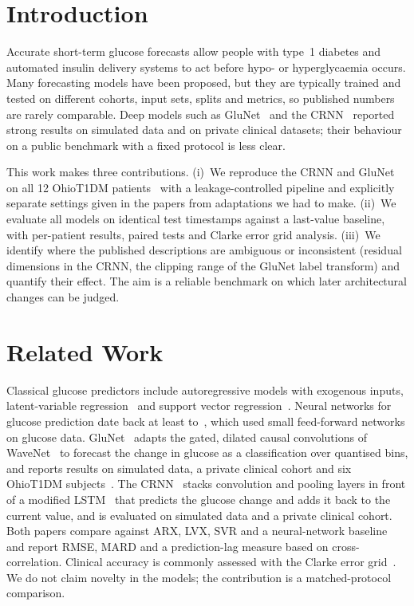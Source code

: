 \documentclass[conference]{IEEEtran}
\begin{document}
\section{Introduction}
Accurate short-term glucose forecasts allow people with type~1 diabetes and automated insulin delivery systems to act before hypo- or hyperglycaemia occurs. Many forecasting models have been proposed, but they are typically trained and tested on different cohorts, input sets, splits and metrics, so published numbers are rarely comparable. Deep models such as GluNet~\cite{glunet} and the CRNN~\cite{crnn} reported strong results on simulated data and on private clinical datasets; their behaviour on a public benchmark with a fixed protocol is less clear.

This work makes three contributions. (i)~We reproduce the CRNN and GluNet on all 12 OhioT1DM patients~\cite{ohio} with a leakage-controlled pipeline and explicitly separate settings given in the papers from adaptations we had to make. (ii)~We evaluate all models on identical test timestamps against a last-value baseline, with per-patient results, paired tests and Clarke error grid analysis. (iii)~We identify where the published descriptions are ambiguous or inconsistent (residual dimensions in the CRNN, the clipping range of the GluNet label transform) and quantify their effect. The aim is a reliable benchmark on which later architectural changes can be judged.
\section{Related Work}
Classical glucose predictors include autoregressive models with exogenous inputs, latent-variable regression~\cite{lvx} and support vector regression~\cite{svr}. Neural networks for glucose prediction date back at least to~\cite{nnpg}, which used small feed-forward networks on glucose data. GluNet~\cite{glunet} adapts the gated, dilated causal convolutions of WaveNet~\cite{wavenet} to forecast the change in glucose as a classification over quantised bins, and reports results on simulated data, a private clinical cohort and six OhioT1DM subjects~\cite{ohio}. The CRNN~\cite{crnn} stacks convolution and pooling layers in front of a modified LSTM~\cite{lstm} that predicts the glucose change and adds it back to the current value, and is evaluated on simulated data and a private clinical cohort. Both papers compare against ARX, LVX, SVR and a neural-network baseline and report RMSE, MARD and a prediction-lag measure based on cross-correlation. Clinical accuracy is commonly assessed with the Clarke error grid~\cite{clarke}. We do not claim novelty in the models; the contribution is a matched-protocol comparison.
\end{document}
